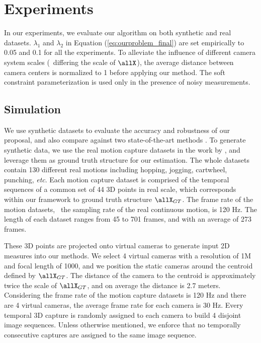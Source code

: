 \section{Experiments} \label{sec:experiment}
In our experiments, we evaluate our algorithm on both synthetic and real datasets. $\lambda_1$ and $\lambda_2$ in Equation (\ref{eq:ourproblem_final}) are set empirically to 0.05 and 0.1 for all the experiments. To alleviate the influence of different camera system scales (\ie~differing the scale of $\allX$), the average distance between camera centers is normalized to 1 before applying our method. The soft constraint parameterization is used only in the presence of noisy measurements.

\subsection{Simulation}
We use synthetic datasets to evaluate the accuracy and robustness of our proposal, and also compare against two state-of-the-art methods \cite{Valmadre_CVPR2012,dai2014simple}.
To generate synthetic data, we use the real motion capture datasets in the work by \citet{cg-2007-2}, and leverage them as ground truth structure for our estimation.
The whole datasets contain 130 different real motions including hopping, jogging, cartwheel, punching, \emph{etc}.
Each motion capture dataset is comprised of the temporal sequences of a common set of 44 3D points in real scale, which corresponds within our framework to ground truth structure $\allX_{GT}$. The frame rate of the motion datasets, \ie~the sampling rate of the real continuous motion, is 120 Hz. The length of each dataset ranges from 45 to 701 frames, and with an average of 273 frames. 

These 3D points are projected onto virtual cameras to generate input 2D measures into our methods.
We select 4 virtual cameras with a resolution of 1M and focal length of 1000, and we position the static cameras around the centroid defined by $\allX_{GT}$. 
The distance of the camera to the centroid is approximately twice the scale of $\allX_{GT}$, and on average the distance is 2.7 meters.
Considering the frame rate of the motion capture datasets is 120 Hz and there are 4 virtual cameras, the average frame rate for each camera is 30 Hz.
Every temporal 3D capture is randomly assigned to each camera to build 4 disjoint image sequences. %
Unless otherwise mentioned, we enforce that no temporally consecutive captures are assigned to the same image sequence.

